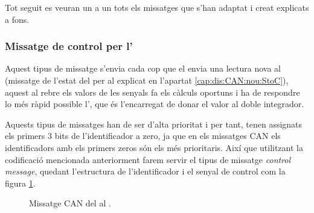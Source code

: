 Tot seguit es veuran un a un tots els missatges que s'han adaptat i creat explicats a fons.


\subsubsection{Missatge de control per l'\Actuador}\label{cap:dis:CAN:nou:CtoA}

Aquest tipus de missatge s'envia cada cop que el \Sensor envia una lectura nova al \Controlador (missatge de l'estat del \Sensor per al \Controlador explicat en l'apartat \ref{cap:dis:CAN:nou:StoC}), aquest al rebre els valors de les senyals fa els càlculs oportuns i ha de respondre lo més ràpid possible l'\Actuador, que és l'encarregat de donar el valor al doble integrador.

Aquests tipus de missatges han de ser d'alta prioritat i per tant, tenen assignats els primers 3 bits de l'identificador a zero, ja que en els missatges CAN els identificadors amb els primers zeros són els més prioritaris. Així que utilitzant la codificació mencionada anteriorment farem servir el tipus de missatge \emph{control message}, quedant l'estructura de l'identificador i el senyal de control com la figura \ref{fig:bit_encoding:CAN:nou:CtoA}.

\begin{figure}[ht!]
	
    \caption{Missatge CAN del \Controlador al \Actuador.}
    \label{fig:bit_encoding:CAN:nou:CtoA}
\end{figure}


